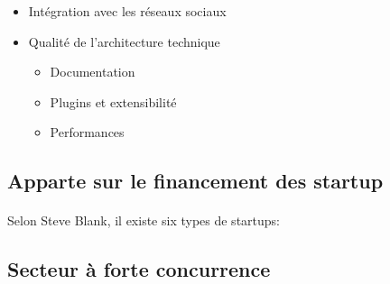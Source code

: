 \documentclass[11pt, a4paper ]{article}
\begin{document}
\begin{itemize}
	\item Intégration avec les réseaux sociaux

	\item Qualité de l'architecture technique
		\begin{itemize}
			\item Documentation

			\item Plugins et extensibilité

			\item Performances

		\end{itemize}

\end{itemize}

		\subsection{Apparte sur le financement des startup}

		\paragraph{}
		Selon Steve Blank, il existe six types de startups\cite{typeStartup}:









		\subsection{Secteur à forte concurrence}
\end{document}
